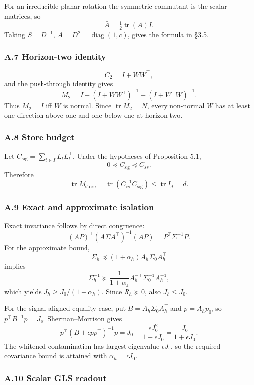 \documentclass[
  10pt,
]{article}
\begin{document}
For an irreducible planar rotation the symmetric commutant is the scalar
matrices, so \[
\bar A=\tfrac12\operatorname{tr}(A)I.
\] Taking \(S=D^{-1}\), \(A=D^2=\operatorname{diag}(1,c)\), gives the
formula in §3.5.

\subsubsection{A.7 Horizon-two identity}\label{a.7-horizon-two-identity}

\[
C_2=I+WW^\top,
\] and the push-through identity gives \[
M_2
=
I+(I+WW^\top)^{-1}-(I+W^\top W)^{-1}.
\] Thus \(M_2=I\) iff \(W\) is normal. Since \(\operatorname{tr}M_2=N\),
every non-normal \(W\) has at least one direction above one and one
below one at horizon two.

\subsubsection{A.8 Store budget}\label{a.8-store-budget}

Let \(C_{\mathrm{sig}}=\sum_{t\in I}L_tL_t^\top\). Under the hypotheses
of Proposition 5.1, \[
0\preceq C_{\mathrm{sig}}\preceq C_{ss}.
\] Therefore \[
\operatorname{tr}M_{\mathrm{store}}
=
\operatorname{tr}(C_{ss}^{-1}C_{\mathrm{sig}})
\le
\operatorname{tr}I_d=d.
\]

\subsubsection{A.9 Exact and approximate
isolation}\label{a.9-exact-and-approximate-isolation}

Exact invariance follows by direct congruence: \[
(A P)^\top(A\Sigma A^\top)^{-1}(A P)=P^\top\Sigma^{-1}P.
\] For the approximate bound, \[
\Sigma_h\preceq(1+\alpha_h)A_h\Sigma_0A_h^\top
\] implies \[
\Sigma_h^{-1}\succeq\frac1{1+\alpha_h}A_h^{-\top}\Sigma_0^{-1}A_h^{-1},
\] which yields \(J_h\ge J_0/(1+\alpha_h)\). Since \(R_h\succeq0\), also
\(J_h\le J_0\).

For the signal-aligned equality case, put \(B=A_h\Sigma_0A_h^\top\) and
\(p=A_hp_0\), so \(p^\top B^{-1}p=J_0\). Sherman--Morrison gives \[
p^\top(B+\epsilon pp^\top)^{-1}p
=J_0-\frac{\epsilon J_0^2}{1+\epsilon J_0}
=\frac{J_0}{1+\epsilon J_0}.
\] The whitened contamination has largest eigenvalue \(\epsilon J_0\),
so the required covariance bound is attained with
\(\alpha_h=\epsilon J_0\).

\subsubsection{A.10 Scalar GLS readout}\label{a.10-scalar-gls-readout}
\end{document}
